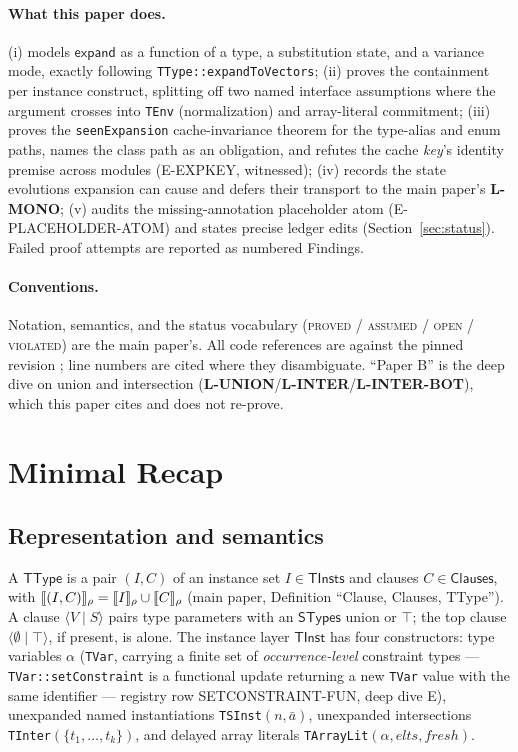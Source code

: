 \documentclass[11pt]{article}
\newcommand{\STypes}{\mathsf{STypes}}
\newcommand{\TType}{\mathsf{TType}}
\newcommand{\TInst}{\mathsf{TInst}}
\newcommand{\TInsts}{\mathsf{TInsts}}
\newcommand{\Clauses}{\mathsf{Clauses}}
\newcommand{\clause}[2]{\langle #1 \mid #2 \rangle}
\newcommand{\expandop}{\mathsf{expand}}
\begin{document}
\paragraph{What this paper does.}
(i) models $\expandop$ as a function of a type, a substitution state, and a
variance mode, exactly following \texttt{TType::expandToVectors};
(ii) proves the containment per instance construct, splitting off two named
interface assumptions where the argument crosses into \texttt{TEnv}
(normalization) and array-literal commitment;
(iii) proves the \texttt{seenExpansion} cache-invariance theorem for the
type-alias and enum paths, names the class path as an obligation, and
refutes the cache \emph{key}'s identity premise across modules
(E-EXPKEY, witnessed);
(iv) records the state evolutions expansion can cause and defers their
transport to the main paper's \textbf{L-MONO};
(v) audits the missing-annotation placeholder atom
(E-PLACEHOLDER-ATOM) and states precise ledger edits
(Section~\ref{sec:status}).
Failed proof attempts are reported as numbered Findings.

\paragraph{Conventions.}
Notation, semantics, and the status vocabulary
(\textsc{proved} / \textsc{assumed} / \textsc{open} / \textsc{violated})
are the main paper's. All code references are against the pinned revision
\texttt{\skjspinhash}; line numbers are cited where they disambiguate.
``Paper B'' is the deep dive on union and intersection
(\textbf{L-UNION}/\textbf{L-INTER}/\textbf{L-INTER-BOT}), which this paper cites and does not
re-prove.

\section{Minimal Recap}
\label{sec:recap}

\subsection{Representation and semantics}

A $\TType$ is a pair $(I, C)$ of an instance set $I \in \TInsts$ and
clauses $C \in \Clauses$, with
$\llbracket (I,C) \rrbracket_\rho = \llbracket I \rrbracket_\rho \cup \llbracket C \rrbracket_\rho$
(main paper, Definition ``Clause, Clauses, TType''). A clause
$\clause{V}{S}$ pairs type parameters with an $\STypes$ union or $\top$;
the top clause $\clause{\emptyset}{\top}$, if present, is alone. The
instance layer $\TInst$ has four constructors:
type variables $\alpha$ (\texttt{TVar}, carrying a finite set of
\emph{occurrence-level} constraint types — \texttt{TVar::setConstraint} is
a functional update returning a new \texttt{TVar} value with the same
identifier — registry row SETCONSTRAINT-FUN, deep dive E), unexpanded
named instantiations
\texttt{TSInst}$(n, \bar{a})$, unexpanded intersections
\texttt{TInter}$(\{t_1,\dots,t_k\})$, and delayed array literals
\texttt{TArrayLit}$(\alpha, \mathit{elts}, \mathit{fresh})$.
\end{document}
